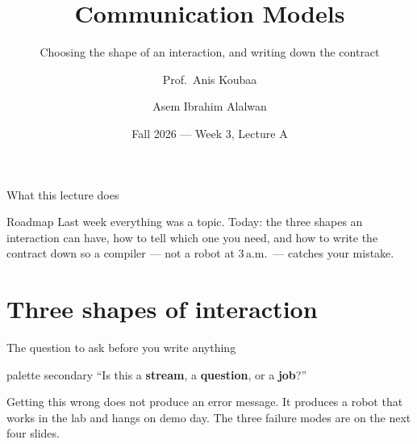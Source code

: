 \documentclass[aspectratio=169]{beamer}
\title[EE 414 --- Week 3A]{Communication Models}
\subtitle{Choosing the shape of an interaction, and writing down the contract}
\author[Koubaa \and Alalwan]{Prof.\ Anis Koubaa \and Asem Ibrahim Alalwan}
\institute[Alfaisal University]{
    EE 414 --- Introduction to Robotics\\
    College of Engineering\\
    Alfaisal University
}
\date{Fall 2026 --- Week 3, Lecture A}
\begin{document}
\begin{frame}[plain]
  \titlepage
\end{frame}

\begin{frame}{What this lecture does}
  \begin{block}{Roadmap}
    \small Last week everything was a topic. Today: the three shapes an interaction can have,
    how to tell which one you need, and how to write the contract down so a compiler --- not a
    robot at 3\,a.m.\ --- catches your mistake.
  \end{block}
  \vspace{0.2em}
  {\scriptsize\tableofcontents[hideallsubsections]}
\end{frame}

\section{Three shapes of interaction}

\begin{frame}{The question to ask before you write anything}
  \begin{beamercolorbox}[sep=8pt,center,rounded=true]{palette secondary}
    \small ``Is this a \textbf{stream}, a \textbf{question}, or a \textbf{job}?''
  \end{beamercolorbox}

  \vspace{0.9em}
  \begin{center}
  \end{center}

  \vspace{0.8em}
  \small
  Getting this wrong does not produce an error message. It produces a robot that works in the
  lab and hangs on demo day. The three failure modes are on the next four slides.
\end{frame}
\end{document}
